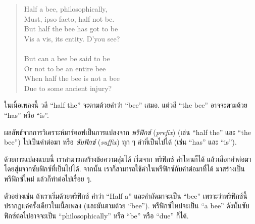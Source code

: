 \begin{quote}
Half a bee, philosophically, \\
Must, ipso facto, half not be. \\
But half the bee has got to be \\
Vis a vis, its entity. D'you see? \\
\\
But can a bee be said to be \\
Or not to be an entire bee \\
When half the bee is not a bee \\
Due to some ancient injury? \\
\end{quote}
%
%
ในเนื้อเพลงนี้ วลี ``half the'' จะตามด้วยคำว่า ``bee'' เสมอ.
แต่วลี ``the bee'' อาจจะตามด้วย 
``has'' หรือ ``is''.

%
ผลลัพธ์จากการวิเคราะห์มาร์คอฟเป็นการแปลงจาก \textit{พรีฟิกซ์} (\textit{prefix})
(เช่น ``half the'' และ ``the bee'') ไปเป็นคำต่อมา หรือ \textit{ซับฟิกซ์} (\textit{suffix}) ทุก ๆ คำที่เป็นไปได้
(เช่น ``has'' และ ``is'').



ด้วยการแปลงแบบนี้ 
เราสามารถสร้างข้อความสุ่มได้
เริ่มจาก พรีฟิกซ์ คำไหนก็ได้ แล้วเลือกคำต่อมาโดยสุ่มจากซับฟิกซ์ที่เป็นไปได้.
จากนั้น เราก็สามารถใช้คำในพรีฟิกซ์กับคำต่อมาที่ได้ มาสร้างเป็นพรีฟิกซ์ใหม่ แล้วก็ทำต่อไปเรื่อย ๆ.


ตัวอย่างเช่น ถ้าเราเริ่มด้วยพรีฟิกซ์ คำว่า ``Half a''
และคำถัดมาจะเป็น ``bee'' เพราะว่าพรีฟิกซ์นี้ปรากฏแค่ครั้งเดียวในเนื้อเพลง (และมันตามด้วย ``bee'').
พรีฟิกซ์ใหม่จะเป็น ``a bee'' ดังนั้นซับฟิกซ์ต่อไปอาจจะเป็น
``philosophically'' หรือ ``be'' หรือ ``due'' ก็ได้.

